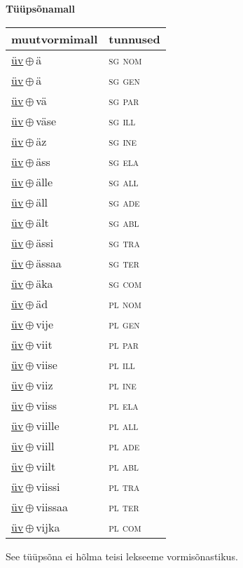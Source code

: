 

\vspace{3.5em}
\noindent \begin{minipage}{\textwidth}
\noindent \textbf{Tüüpsõnamall \,}\\

\begin{sideways}
\begin{tabular}{l l}
muutvormimall & tunnused \\
\hline
\underline{üv}\,$\oplus$\,ä & \textsc{ sg nom } \\
\underline{üv}\,$\oplus$\,ä & \textsc{ sg gen } \\
\underline{üv}\,$\oplus$\,vä & \textsc{ sg par } \\
\underline{üv}\,$\oplus$\,väse & \textsc{ sg ill } \\
\underline{üv}\,$\oplus$\,äz & \textsc{ sg ine } \\
\underline{üv}\,$\oplus$\,äss & \textsc{ sg ela } \\
\underline{üv}\,$\oplus$\,älle & \textsc{ sg all } \\
\underline{üv}\,$\oplus$\,äll & \textsc{ sg ade } \\
\underline{üv}\,$\oplus$\,ält & \textsc{ sg abl } \\
\underline{üv}\,$\oplus$\,ässi & \textsc{ sg tra } \\
\underline{üv}\,$\oplus$\,ässaa & \textsc{ sg ter } \\
\underline{üv}\,$\oplus$\,äka & \textsc{ sg com } \\
\underline{üv}\,$\oplus$\,äd & \textsc{ pl nom } \\
\underline{üv}\,$\oplus$\,vije & \textsc{ pl gen } \\
\underline{üv}\,$\oplus$\,viit & \textsc{ pl par } \\
\underline{üv}\,$\oplus$\,viise & \textsc{ pl ill } \\
\underline{üv}\,$\oplus$\,viiz & \textsc{ pl ine } \\
\underline{üv}\,$\oplus$\,viiss & \textsc{ pl ela } \\
\underline{üv}\,$\oplus$\,viille & \textsc{ pl all } \\
\underline{üv}\,$\oplus$\,viill & \textsc{ pl ade } \\
\underline{üv}\,$\oplus$\,viilt & \textsc{ pl abl } \\
\underline{üv}\,$\oplus$\,viissi & \textsc{ pl tra } \\
\underline{üv}\,$\oplus$\,viissaa & \textsc{ pl ter } \\
\underline{üv}\,$\oplus$\,vijka & \textsc{ pl com } \\
\end{tabular}
\end{sideways}
\label{tab:tüüpsõnamall-üvä}

\end{minipage}

 
\vspace{1em}
\noindent See tüüpsõna ei hõlma teisi lekseeme vormi\-sõnastikus.
